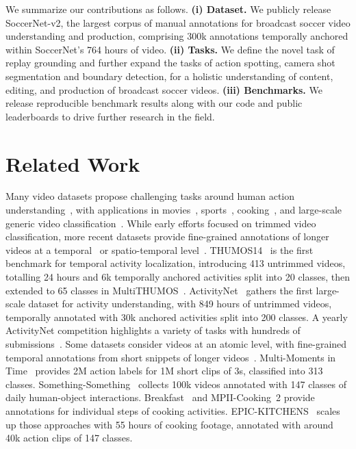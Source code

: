 \documentclass[final]{cvsports}
\begin{document}
 We summarize our contributions as follows. 
\textbf{(i) Dataset.} We publicly release SoccerNet-v2, the largest corpus of manual annotations for broadcast soccer video understanding and production, comprising \texttildelow 300k annotations temporally anchored within SoccerNet's 764 hours of video. 
\textbf{(ii) Tasks.} We define the novel task of replay grounding and further expand the tasks of action spotting, camera shot segmentation and boundary detection, for a holistic understanding of content, editing, and production of broadcast soccer videos.
\textbf{(iii) Benchmarks.} We release reproducible benchmark results along with our code and public leaderboards to drive further research in the field.
    \section{Related Work}
\label{sec:SOTA}


Many video datasets propose challenging tasks around human action understanding~\cite{gorelick2007actions,schuldt2004recognizing}, with applications in
movies~\cite{Kuehne11,marszalek2009actions,sigurdsson2016hollywood}, 
sports~\cite{KarpathyCVPR14,niebles2010modeling,rodriguez2008action}, 
cooking~\cite{damen2020epic,kuehne2014language,rohrbach2012database}, and large-scale generic video classification~\cite{abu2016youtube,kay2017kinetics,soomro2012ucf101}.
While early efforts focused on trimmed video classification, more recent datasets provide fine-grained annotations of longer videos at a 
temporal~\cite{caba2015activitynet,THUMOS14,sigurdsson2016hollywood,yeung2018every,zhao2019hacs} or spatio-temporal level~\cite{gu2018ava,mettes2016spot,rodriguez2008action,weinzaepfel2016human}. THUMOS14~\cite{THUMOS14} is the first benchmark for temporal activity localization, introducing 413 untrimmed videos, totalling 24 hours and 6k temporally anchored activities split into 20 classes, then extended to 65 classes in MultiTHUMOS~\cite{yeung2018every}.
ActivityNet~\cite{caba2015activitynet} gathers the first large-scale dataset for activity understanding, with 849 hours of untrimmed videos, temporally annotated with 30k anchored activities split into 200 classes. A yearly ActivityNet competition highlights a variety of tasks with hundreds of submissions~\cite{ghanem2018activitynet,ghanem2017activitynet}.
Some datasets consider videos at an atomic level, with fine-grained temporal annotations from short snippets of longer videos~\cite{gu2018ava,monfort2019moments,zhao2019hacs}. Multi-Moments in Time~\cite{monfort2019multi} provides 2M action labels for 1M short clips of 3s, classified into 313 classes.
Something-Something~\cite{goyal2017something} collects 100k videos annotated with 147 classes of daily human-object interactions.
Breakfast~\cite{kuehne2014language} and MPII-Cooking~2 \cite{rohrbach2016recognizing} provide annotations for individual steps of cooking activities. 
EPIC-KITCHENS~\cite{damen2020epic} scales up those approaches with 55 hours of cooking footage, annotated with around 40k action clips of 147 classes.
\end{document}
